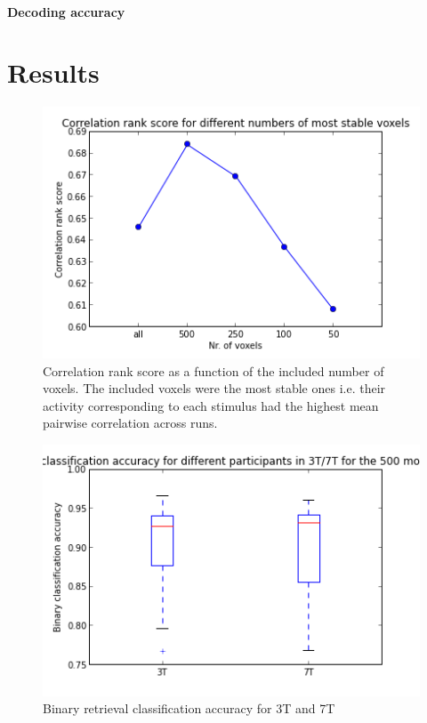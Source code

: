 \paragraph{Decoding accuracy}


\section*{Results}

	
\begin{figure}
	\centering
	\includegraphics[width=\linewidth]{pics/voxelnr}
	\caption{Correlation rank score as a function of the included number of voxels. The included voxels were the most stable ones i.e. their activity corresponding to each stimulus had the highest mean pairwise correlation across runs.}
	\label{fig:voxelnr}
\end{figure}
 
 
 
\begin{figure}
	\centering
	\includegraphics[width=\linewidth]{pics/binary_retrieval_accuracy}
	\caption{Binary retrieval classification accuracy for 3T and 7T}
	\label{fig:binretr}
\end{figure}
 
